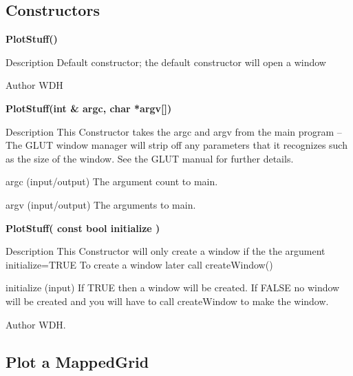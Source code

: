 \subsection{Constructors}
 
\begin{flushleft} \textbf{%
\newlength{\argIndent}\settowidth{\argIndent}{PlotStuff(}%
PlotStuff()
}\end{flushleft}
\begin{Lentry}
\item[Description] 
   Default constructor; the default constructor will open a window
\item[Author]  WDH

\end{Lentry}

 
\begin{flushleft} \textbf{%
\settowidth{\argIndent}{PlotStuff(}%
PlotStuff(int \& argc, char *argv[]) 
}\end{flushleft}
\begin{Lentry}
\item[Description] 
   This Constructor takes the argc and argv from the main program -- The GLUT 
   window manager will strip off any parameters that it recognizes such as the
   size of the window. See the GLUT manual for further details.

\item[argc (input/output)]  The argument count to main.
\item[argv (input/output)]  The arguments to main.

\end{Lentry}

 
\begin{flushleft} \textbf{%
\settowidth{\argIndent}{PlotStuff(}%
PlotStuff( const bool initialize )
}\end{flushleft}
\begin{Lentry}
\item[Description] 
    This Constructor will only create a window if the the argument initialize=TRUE
    To create a window later call createWindow()

\item[initialize (input)]  If TRUE then a window will be created. If FALSE no window will
         be created and you will have to call {\ff createWindow} to make the window.

\item[Author]  WDH.  
\end{Lentry}
\subsection{Plot a MappedGrid}
 
